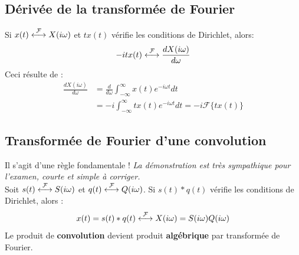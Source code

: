 	\subsection{Dérivée de la transformée de Fourier}
	Si $x(t) \ft X(i\omega)$ et $tx(t)$ vérifie les conditions de Dirichlet,
	alors:
	\begin{equation}
	-itx(t) \ft \frac{dX(i\omega)}{d\omega}
	\end{equation}
	Ceci résulte de :
	\begin{equation}
	\begin{array}{ll}
	\frac{dX(i\omega)}{d\omega} &= \frac{d}{d\omega}\int_{-\infty}^\infty 
	x(t)e^{-i\omega t}dt\\
	 &= -i \int_{-\infty}^\infty tx(t)e^{-i\omega t}dt = -i\mathcal{F}\{tx(t)\}
	\end{array}
	\end{equation}



	\subsection{Transformée de Fourier d'une convolution}
	Il s'agit d'une règle fondamentale ! \textit{La démonstration est très sympathique
	pour l'examen, courte et simple à corriger.}\\
	Soit $s(t) \ft S(i\omega)$ et $q(t) \ft Q(i\omega)$. Si $s(t)*q(t)$ vérifie les 
	conditions de Dirichlet, alors :
	\begin{equation}
	x(t) = s(t)*q(t) \ft X(i\omega) = S(i\omega)Q(i\omega)
	\label{eq:TransfoConvol}
	\end{equation}
	Le produit de \textbf{convolution} devient produit \textbf{algébrique} par transformée 
	de Fourier.
	
